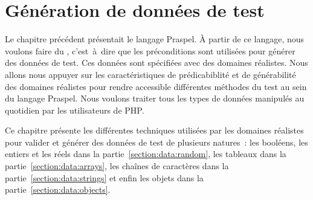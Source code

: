 \chapter{Génération de données de test}
\label{chapter:data}

\mminitoc

Le chapitre précédent présentait le langage Praspel. À partir de ce langage,
nous voulons faire du , c'est~à~dire que les
préconditions sont utilisées pour générer des données de test. Ces données sont
spécifiées avec des domaines réalistes. Nous allons nous appuyer sur les
caractéristiques de prédicabiblité et de générabilité des domaines réalistes
pour rendre accessible différentes méthodes du test au sein du langage Praspel.
Nous voulons traiter tous les types de données manipulés au quotidien par les
utilisateurs de PHP.

Ce chapitre présente les différentes techniques utilisées par les domaines
réalistes pour valider et générer des données de test de plusieurs natures~: les
booléens, les entiers et les réels dans la partie~\ref{section:data:random}, les
tableaux dans la partie~\ref{section:data:arrays}, les chaînes de caractères
dans la partie~\ref{section:data:strings} et enfin les objets dans la
partie~\ref{section:data:objects}.

